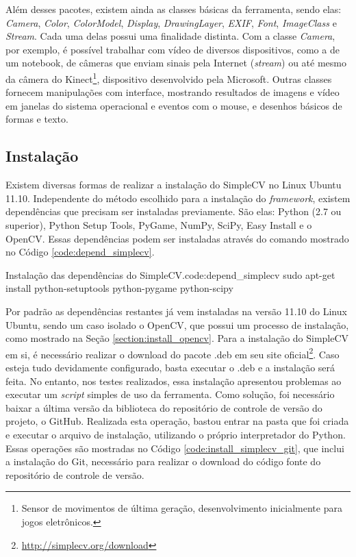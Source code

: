 Além desses pacotes, existem ainda as classes básicas da ferramenta, sendo elas: \textit{Camera}, \textit{Color}, \textit{ColorModel}, \textit{Display}, \textit{DrawingLayer}, \textit{EXIF}, \textit{Font}, \textit{ImageClass} e \textit{Stream}. Cada uma delas possui uma finalidade distinta. Com a classe \textit{Camera}, por exemplo, é possível trabalhar com vídeo de diversos dispositivos, como a de um notebook, de câmeras que enviam sinais pela Internet (\textit{stream}) ou até mesmo da câmera do Kinect\footnote{Sensor de movimentos de última geração, desenvolvimento inicialmente para jogos eletrônicos.}, dispositivo desenvolvido pela Microsoft. Outras classes fornecem manipulações com interface, mostrando resultados de imagens e vídeo em janelas do sistema operacional e eventos com o mouse, e desenhos básicos de formas e texto.

\subsection{Instalação}

Existem diversas formas de realizar a instalação do SimpleCV no Linux Ubuntu 11.10. Independente do método escolhido para a instalação do \textit{framework}, existem dependências que precisam ser instaladas previamente. São elas: Python (2.7 ou superior), Python Setup Tools, PyGame, NumPy, SciPy, Easy Install e o OpenCV. Essas dependências podem ser instaladas através do comando mostrado no Código \ref{code:depend_simplecv}.

\begin{terminal}{Instalação das dependências do SimpleCV.}{code:depend_simplecv}
sudo apt-get install python-setuptools python-pygame python-scipy
\end{terminal}

Por padrão as dependências restantes já vem instaladas na versão 11.10 do Linux Ubuntu, sendo um caso isolado o OpenCV, que possui um processo de instalação, como mostrado na Seção \ref{section:install_opencv}. Para a instalação do SimpleCV em si, é necessário realizar o download do pacote .deb em seu site oficial\footnote{\url{http://simplecv.org/download}}. Caso esteja tudo devidamente configurado, basta executar o .deb e a instalação será feita. No entanto, nos testes realizados, essa instalação apresentou problemas ao executar um \textit{script} simples de uso da ferramenta. Como solução, foi necessário baixar a última versão da biblioteca do repositório de controle de versão do projeto, o GitHub. Realizada esta operação, bastou entrar na pasta que foi criada e executar o arquivo de instalação, utilizando o próprio interpretador do Python. Essas operações são mostradas no Código \ref{code:install_simplecv_git}, que inclui a instalação do Git, necessário para realizar o download do código fonte do repositório de controle de versão.

